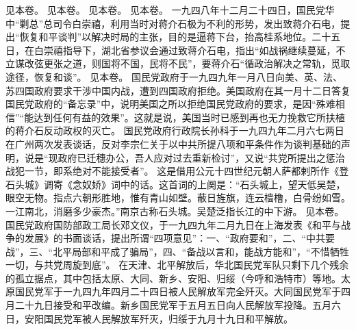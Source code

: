 \begin{maonote}
见本卷。
见本卷。
见本卷。
见本卷。
一九四八年十二月二十四日，国民党华中“剿总”总司令白崇禧，利用当时对蒋介石极为不利的形势，发出致蒋介石电，提出“恢复和平谈判”以解决时局的主张，目的是逼蒋下台，抬高桂系地位。二十五日，在白崇禧指导下，湖北省参议会通过致蒋介石电，指出“如战祸继续蔓延，不立谋改弦更张之道，则国将不国，民将不民”，要蒋介石“循政治解决之常轨，觅取途径，恢复和谈”。
见本卷。
国民党政府于一九四九年一月八日向美、英、法、苏四国政府要求干涉中国内战，遭到四国政府拒绝。美国政府在其一月十二日答复国民党政府的“备忘录”中，说明美国之所以拒绝国民党政府的要求，是因“殊难相信”“能达到任何有益的效果”。这就是说，美国当时已感到再也无力挽救它所扶植的蒋介石反动政权的灭亡。
国民党政府行政院长孙科于一九四九年二月六七两日在广州两次发表谈话，反对李宗仁关于以中共所提八项和平条件作为谈判基础的声明，说是“现政府已迁穗办公，吾人应对过去重新检讨”，又说“共党所提出之惩治战犯一节，即系绝对不能接受者”。
这是借用公元十四世纪元朝人萨都剌所作《登石头城》调寄《念奴娇》词中的话。这首词的上阕是：“石头城上，望天低吴楚，眼空无物。指点六朝形胜地，惟有青山如壁。蔽日旌旗，连云樯橹，白骨纷如雪。一江南北，消磨多少豪杰。”南京古称石头城。吴楚泛指长江的中下游。
见本卷。
国民党政府国防部政工局长邓文仪，于一九四九年二月九日在上海发表《和平与战争的发展》的书面谈话，提出所谓“四项意见”：一、“政府要和”，二、“中共要战”，三、“北平局部和平成了骗局”，四、“备战以言和，能战方能和”，“不惜牺牲一切，与共党周旋到底”。
在天津、北平解放后，华北国民党军队只剩下几个残余的孤立据点，其中包括太原、大同、新乡、安阳、归绥（今呼和浩特市）等地。太原国民党军于一九四九年四月二十四日被人民解放军完全歼灭。大同国民党军于四月二十九日接受和平改编。新乡国民党军于五月五日向人民解放军投降。五月六日，安阳国民党军被人民解放军歼灭，归绥于九月十九日和平解放。
\end{maonote}

